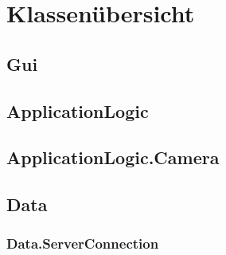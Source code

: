 \section{Klassenübersicht}

\subsection{Gui}

\newpage


\newpage


\newpage


\newpage


\newpage


\newpage


\newpage

\subsection{ApplicationLogic}

\newpage


\newpage


\newpage


\newpage


\newpage


\newpage

\subsection{ApplicationLogic.Camera}

\newpage


\newpage


\newpage


\newpage

\subsection{Data}
\subsubsection{Data.ServerConnection}


\newpage


\newpage


\newpage


\newpage